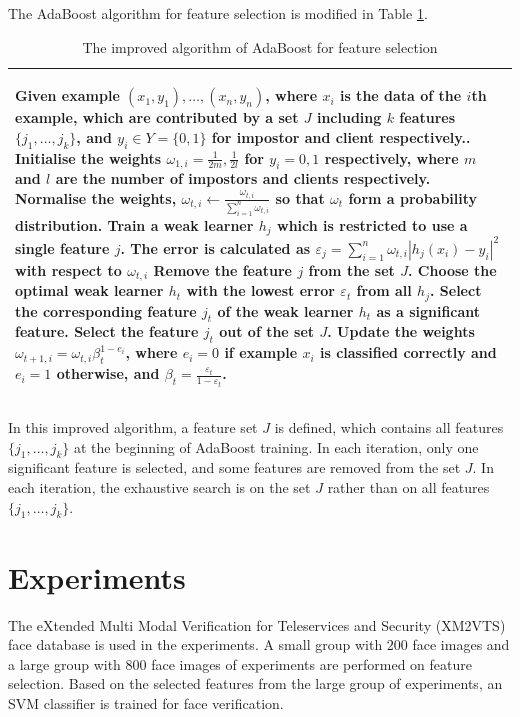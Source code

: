 The AdaBoost algorithm for feature selection is modified in \mbox{Table} \ref{tab:retimeadaboostfs}. 
\begin{table}[ht]
\caption{The improved algorithm of AdaBoost for feature selection}
\begin{tabular}{p{\columnwidth}}
\hline
\begin{algorithmic}[1]
\STATE Given example $(x_{1},y_{1}),\ldots,(x_{n},y_{n})$, where $x_{i}$ is the data of the $i$th example, which are contributed by a set $J$ including $k$ features $\{j_{1},\ldots,j_{k}\}$, and $y_{i} \in Y=\{0,1\}$ for impostor and client respectively..
\STATE Initialise the weights $\omega_{1,i}=\frac{1}{2m},\frac{1}{2l}$ for $y_{i}=0,1$ respectively, where $m$ and $l$ are the number of impostors and clients respectively.
\FOR{$t=1,\ldots,T$}
	\STATE Normalise the weights, $\omega_{t,i}\leftarrow\frac{\omega_{t,i}}{\sum_{i=1}^{n}\omega_{t,i}}$ so that $\omega_{t}$ form a probability distribution.
	\FORALL{$j$ in the set $J$}
		\STATE Train a weak learner $h_{j}$ which is restricted to use a single feature $j$. 
		\STATE The error is calculated as $\varepsilon_{j}=\sum_{i=1}^{n}\omega_{t,i}|h_{j}(x_{i})-y_{i}|^{2}$ with respect to $\omega_{t,i}$
		\IF{$\varepsilon \ge 0.5$}
			\STATE Remove the feature $j$ from the set $J$.
		\ENDIF
	\ENDFOR
	\STATE Choose the optimal weak learner $h_{t}$ with the lowest error $\varepsilon_{t}$ from all $h_{j}$.
	\STATE Select the corresponding feature $j_{t}$ of the weak learner $h_{t}$ as a significant feature.
	\STATE Select the feature $j_{t}$ out of the set $J$.
	\STATE Update the weights $\omega_{t+1,i}=\omega_{t,i}\beta_{t}^{1-e_{i}}$, where $e_{i}=0$ if example $x_{i}$ is classified correctly and $e_{i}=1$ otherwise, and $\beta_{t}=\frac{\varepsilon_{t}}{1-\varepsilon_{t}}$.	
\ENDFOR
\end{algorithmic}\\
\hline
\end{tabular}
\label{tab:retimeadaboostfs}
\end{table} 
In this improved algorithm, a feature set $J$ is defined, which contains all features $\{j_{1},\ldots,j_{k}\}$ at the beginning of AdaBoost training. In each iteration, only one significant feature is selected, and some features are removed from the set $J$.  In each iteration, the exhaustive search is on the set $J$ rather than on all features $\{j_{1},\ldots,j_{k}\}$.


\section{Experiments}
\label{sec:experiments}
The eXtended Multi Modal Verification for Teleservices and Security (XM2VTS) face database is used in the experiments. A small group with $200$ face images and a large group with $800$ face images of experiments are performed on feature selection. Based on the selected features from the large group of experiments, an SVM classifier is trained for face verification.

